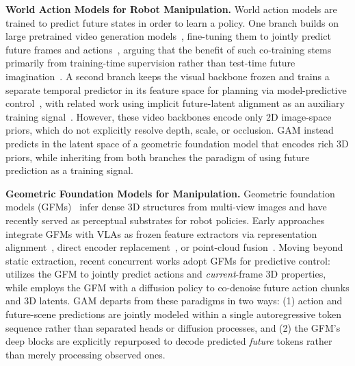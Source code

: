 \noindent\textbf{World Action Models for Robot Manipulation.}
World action models are trained to predict future states in order to learn a policy. One branch builds on large pretrained video generation models~\citep{agarwal2025cosmos}, fine-tuning them to jointly predict future frames and actions~\citep{kim2026cosmos, pai2025mimic, ye2026world}, arguing that the benefit of such co-training stems primarily from training-time supervision rather than test-time future imagination~\citep{ye2026world, pi0_fast}. A second branch keeps the visual backbone frozen and trains a separate temporal predictor in its feature space for planning via model-predictive control~\citep{zhou2024dino, assran2025v}, with related work using implicit future-latent alignment as an auxiliary training signal~\citep{zheng2025flare}. However, these video backbones encode only 2D image-space priors, which do not explicitly resolve depth, scale, or occlusion. GAM instead predicts in the latent space of a geometric foundation model that encodes rich 3D priors, while inheriting from both branches the paradigm of using future prediction as a training signal.


\noindent\textbf{Geometric Foundation Models for Manipulation.} Geometric foundation models (GFMs)~\cite{wang2025vggt, lin2025depth, wang2025pi, keetha2025mapanything} infer dense 3D structures from multi-view images and have recently served as perceptual substrates for robot policies. Early approaches integrate GFMs with VLAs as frozen feature extractors via representation alignment~\citep{li2025spatial, sun2026rocket}, direct encoder replacement~\citep{abouzeid2025geoaware, qian2025gp3}, or point-cloud fusion~\citep{sun2025geovla}. Moving beyond static extraction, recent concurrent works adopt GFMs for predictive control: \citet{song2026robotic} utilizes the GFM to jointly predict actions and \emph{current}-frame 3D properties, while \citet{xu2026action} employs the GFM with a diffusion policy to co-denoise future action chunks and 3D latents. GAM departs from these paradigms in two ways: (1) action and future-scene predictions are jointly modeled within a single autoregressive token sequence rather than separated heads or diffusion processes, and (2) the GFM's deep blocks are explicitly repurposed to decode predicted \emph{future} tokens rather than merely processing observed ones.
